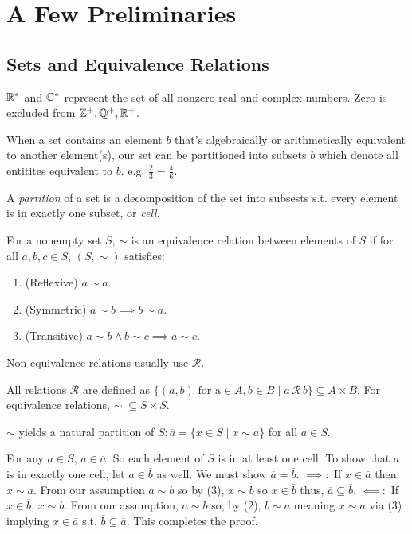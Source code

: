 \chapter{A Few Preliminaries}

\section{Sets and Equivalence Relations}

\begin{note}
    $\mathbb{R}^*$ and $\mathbb{C}^*$ represent the set of all nonzero real and complex numbers. Zero is excluded from $\mathbb{Z}^+, \mathbb{Q}^+, \mathbb{R}^+$.
\end{note}
\begin{note}
    When a set contains an element $b$ that's algebraically or arithmetically equivalent to another element(s), our set can be partitioned into subsets $\overline{b}$ which denote all entitites equivalent to $b$. e.g. $\frac{2}{3} = \frac{4}{6}$.
\end{note}
\begin{definition}[Parititon]
    A \textit{partition} of a set is a decomposition of the set into subsests s.t. every element is in exactly one subset, or \textit{cell}.
\end{definition}
\begin{definition}
    For a nonempty set $S$, $\sim$ is an equivalence relation between elements of $S$ if for all $a,b,c \in S$, $(S, \sim)$ satisfies:
    \begin{enumerate}
        \item (Reflexive) $a\sim a$.
        \item (Symmetric) $a\sim b \implies b\sim a$.
        \item (Transitive) $a\sim b \land b\sim c \implies a\sim c$.
    \end{enumerate}
    Non-equivalence relations usually use $\mathscr{R}$. 
\end{definition}
\begin{note}
    All relations $\mathscr{R}$ are defined as $\{ (a,b) \text{ for a} \in A, b \in B \mid a \, \mathscr{R} \, b\} \subseteq A \times B$. For equivalence relations, $\sim \; \subseteq S \times S$.
\end{note}
\begin{remark}
    $\sim$ yields a natural partition of $S\colon \overline{a} = \{x \in S \mid x \sim a\}$ for all $a \in S$.
\end{remark}
\begin{explanation}
    For any $a \in S$, $a \in \overline{a}$. So each element of $S$ is in at least one cell. To show that $a$ is in exactly one cell, let $a \in \overline{b}$ as well. We must show $\overline{a} = \overline{b}$. $\implies:$ If $x \in \overline{a}$ then $x \sim a$. From our assumption $a \sim b$ so by (3), $x \sim b$ so $x \in \overline{b}$ thus, $\overline{a} \subseteq \overline{b}$. $\impliedby:$ If $x \in \overline{b}$, $x \sim b$. From our assumption, $a \sim b$ so, by (2), $b \sim a$ meaning $x \sim a$ via (3) implying $x \in \overline{a}$ s.t. $\overline{b} \subseteq \overline{a}$. This completes the proof.
\end{explanation}
